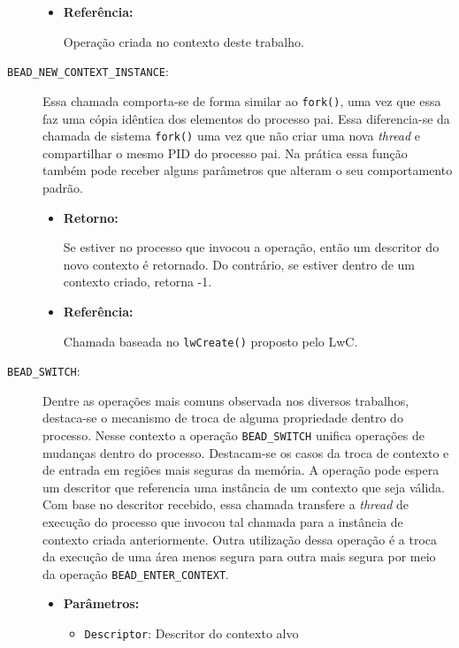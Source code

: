 \begin{description}
\begin{itemize}
    \item \textbf{Referência:}

Operação criada no contexto deste trabalho.

	\end{itemize}

  \item [\texttt{BEAD\_NEW\_CONTEXT\_INSTANCE}:]

Essa chamada comporta-se de forma similar ao \texttt{fork()}, uma vez que essa
faz uma cópia idêntica dos elementos do processo pai. Essa diferencia-se da
chamada de sistema \texttt{fork()} uma vez que não criar uma nova \emph{thread} e
compartilhar o mesmo PID do processo pai. Na prática essa função também pode
receber alguns parâmetros que alteram o seu comportamento padrão.

  \begin{itemize}
    \item \textbf{Retorno:}

Se estiver no processo que invocou a operação, então um descritor do novo
contexto é retornado. Do contrário, se estiver dentro de um contexto criado,
retorna -1.

    \item \textbf{Referência:}

Chamada baseada no \texttt{lwCreate()} proposto pelo LwC.

  \end{itemize}

  \item [\texttt{BEAD\_SWITCH}:]

Dentre as operações mais comuns observada nos diversos trabalhos, destaca-se o
mecanismo de troca de alguma propriedade dentro do processo. Nesse contexto a
operação \texttt{BEAD\_SWITCH} unifica operações de mudanças dentro do
processo. Destacam-se os casos da troca de contexto e de entrada em regiões
mais seguras da memória. A operação pode espera um descritor que referencia uma
instância de um contexto que seja válida. Com base no descritor recebido, essa
chamada transfere a \emph{thread} de execução do processo que invocou tal chamada para
a instância de contexto criada anteriormente. Outra utilização dessa operação é
a troca da execução de uma área menos segura para outra mais segura por meio da
operação \texttt{BEAD\_ENTER\_CONTEXT}.

  \begin{itemize}
    \item \textbf{Parâmetros:}

    \begin{itemize}
      \item \texttt{Descriptor}: Descritor do contexto alvo
    \end{itemize}


\end{itemize}
\end{description}
